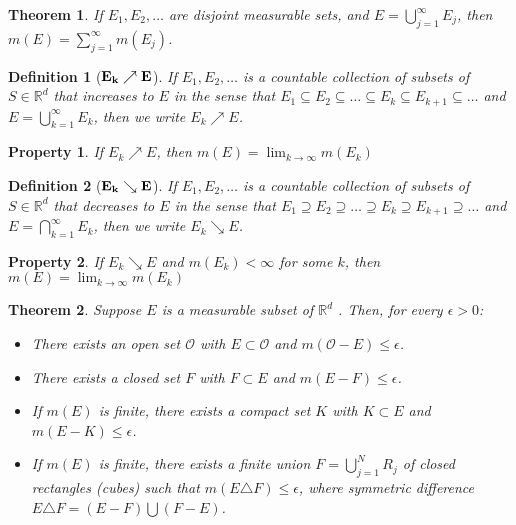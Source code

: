 \documentclass{report}
\theoremstyle{upthm}
\newtheorem{thm}{Theorem}
\newtheorem{defn}{Definition}
\newtheorem{property}{Property}
\newcommand{\reals}{\mathbb{R}}
\newcommand{\calO}{{\mathcal{O}}}
\newcommand{\union}{\bigcup}
\newcommand{\intersection}{\bigcap}
\begin{document}
\begin{thm}
	If $E_1, E_2, \dots$ are disjoint measurable sets, and $E = \union_{j=1}^{\infty} E_j$, then $m(E) = \sum_{j=1}^{\infty} m(E_j)$.
\end{thm}

\begin{defn}[$\bf E_k \nearrow E$]
	If $E_1, E_2, \dots $ is a countable collection of subsets of $S \in \reals^d$ that increases to $E$ in the sense that $ E_1 \subseteq E_2 \subseteq \dots \subseteq E_k \subseteq E_{k+1} \subseteq \dots $  and $E = \union_{k=1}^{\infty} E_k$, then we write $E_k \nearrow E$.
\end{defn}

\begin{property} 
	If $E_k \nearrow E$, then $m(E) = \lim_{k \rightarrow \infty} m(E_k)$
\end{property}

\begin{defn}[$\bf E_k \searrow E$]
	If $E_1, E_2, \dots $ is a countable collection of subsets of $S \in \reals^d$ that decreases to $E$ in the sense that $ E_1 \supseteq E_2 \supseteq \dots \supseteq E_k \supseteq E_{k+1} \supseteq \dots $  and $E = \intersection_{k=1}^{\infty} E_k$, then we write $E_k \searrow E$.
\end{defn}

\begin{property} 
	If $E_k \searrow E$ and $m(E_k) < \infty$ for some $k$, then $m(E) = \lim_{k \rightarrow \infty} m(E_k)$
\end{property}

\begin{thm}
	Suppose $E$ is a measurable subset of $\reals^d$ . Then, for every $\epsilon > 0$:
	\begin{itemize}
		\item There exists an open set $\calO$ with $E \subset \calO$ and $m(\calO - E) \leq \epsilon$.
		\item There exists a closed set $F$ with $F \subset E$ and $m(E - F ) \leq \epsilon$.
		\item If $m(E)$ is finite, there exists a compact set $K$ with $K \subset E$ and $m(E - K) \leq \epsilon$.
		\item If $m(E)$ is finite, there exists a finite union $F = \union_{j=1}^N R_j$ of closed rectangles (cubes) such that $m (E \triangle F) \leq \epsilon$, where symmetric difference $E \triangle F = (E - F) \union (F - E)$.
	\end{itemize}
\end{thm}
\end{document}
